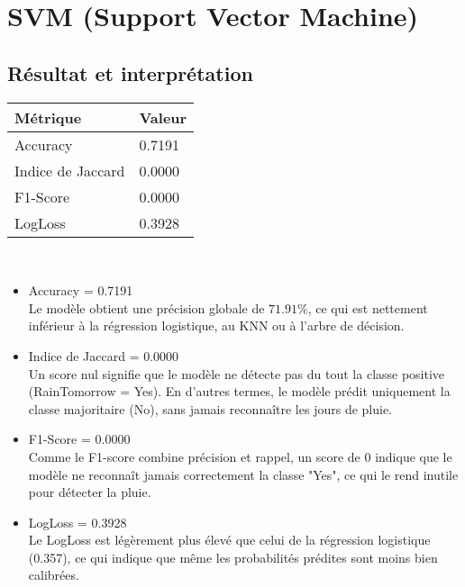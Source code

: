 \documentclass[a4paper,11pt]{article}
\begin{document}
	\newpage
	\vspace{1.5cm}
	\section{SVM (Support Vector Machine) }
	\subsection{Résultat et interprétation}
	\begin{center}
		\begin{tabular}{|l|l|}
			\hline
			\textbf{Métrique} & \textbf{Valeur}  \\
			\hline
			Accuracy & 0.7191 \\
			\hline
			Indice de Jaccard & 0.0000 \\
			\hline
			F1-Score & 0.0000 \\
			\hline
			LogLoss & 0.3928\\
			\hline
		\end{tabular}
	\end{center}
	\\ 
		\begin{itemize}
		\item Accuracy = 0.7191 \\
		Le modèle obtient une précision globale de $71.91 \%$, ce qui est nettement inférieur à la régression logistique, au KNN ou à l’arbre de décision.
		
		
		\item   Indice de Jaccard = 0.0000\\
		Un score nul signifie que le modèle ne détecte pas du tout la classe positive (RainTomorrow = Yes).
		En d'autres termes, le modèle prédit uniquement la classe majoritaire (No), sans jamais reconnaître les jours de pluie.
		
		
		\item  F1-Score = 0.0000 \\
		Comme le F1-score combine précision et rappel, un score de 0 indique que le modèle ne reconnaît jamais correctement la classe "Yes", ce qui le rend inutile pour détecter la pluie.
		
		\item    LogLoss = 0.3928\\
		Le LogLoss est légèrement plus élevé que celui de la régression logistique (0.357), ce qui indique que même les probabilités prédites sont moins bien calibrées.
	\end{itemize}
	
\end{document}
